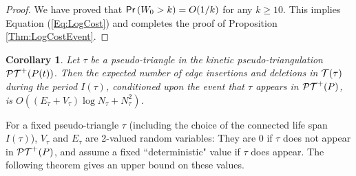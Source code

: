\documentclass[11pt]{article}
\def\PT{{\cal PT}}
\def\T{{\cal T}}
\def\prob{{\sf Pr}}
\newtheorem{corollary}[theorem]{Corollary}
\begin{document}
\begin{proof}
We have proved that $\prob\left(W_0>k\right)=O(1/k)$ for any $k\geq 10$. This implies Equation (\ref{Eq:LogCost}) and completes the proof of Proposition \ref{Thm:LogCostEvent}.
\end{proof}

\begin{corollary}\label{Corol:LogCostEvent}
Let $\tau$ be a pseudo-triangle in the kinetic pseudo-triangulation $\PT^+(P(t))$. Then the expected number of edge insertions and deletions in $\T(\tau)$ during the period $I(\tau)$, conditioned upon the event that $\tau$ appears in $\PT^+(P)$, is $O((E_\tau+V_\tau)\log N_\tau+N_\tau^2)$.
\end{corollary}


For a fixed pseudo-triangle $\tau$ (including the choice of the connected life span $I(\tau)$), $V_\tau$ and $E_\tau$ are 2-valued random variables: They are $0$ if $\tau$ does not appear in $\PT^+(P)$, and assume a fixed ``deterministic" value if $\tau$ does appear.
The following theorem gives an upper bound on these values.
\end{document}
